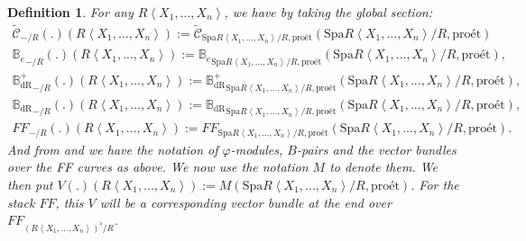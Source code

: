 \documentclass[12pt]{book}
\newtheorem{definition}{Definition}
\begin{document}
\begin{definition}
For any $R\left<X_1,...,X_n\right>$, we have by taking the global section:
\begin{align}
\widetilde{\mathcal{C}}_{-/R}(.)(R\left<X_1,...,X_n\right>):=\widetilde{\mathcal{C}}_{\mathrm{Spa}R\left<X_1,...,X_n\right>/R,\text{pro\'et}}(\mathrm{Spa}R\left<X_1,...,X_n\right>/R,\text{pro\'et})\\
{\mathbb{B}_e}_{-/R}(.)(R\left<X_1,...,X_n\right>):={\mathbb{B}_e}_{\mathrm{Spa}R\left<X_1,...,X_n\right>/R,\text{pro\'et}}(\mathrm{Spa}R\left<X_1,...,X_n\right>/R,\text{pro\'et}),\\
{\mathbb{B}_\mathrm{dR}^+}_{-/R}(.)(R\left<X_1,...,X_n\right>):={\mathbb{B}_\mathrm{dR}^+}_{\mathrm{Spa}R\left<X_1,...,X_n\right>/R,\text{pro\'et}}(\mathrm{Spa}R\left<X_1,...,X_n\right>/R,\text{pro\'et}),\\
{\mathbb{B}_\mathrm{dR}}_{-/R}(.)(R\left<X_1,...,X_n\right>):={\mathbb{B}_\mathrm{dR}}_{\mathrm{Spa}R\left<X_1,...,X_n\right>/R,\text{pro\'et}}(\mathrm{Spa}R\left<X_1,...,X_n\right>/R,\text{pro\'et}),\\
{{FF}}_{-/R}(.)(R\left<X_1,...,X_n\right>):={FF}_{\mathrm{Spa}R\left<X_1,...,X_n\right>/R,\text{pro\'et}}(\mathrm{Spa}R\left<X_1,...,X_n\right>/R,\text{pro\'et}).
\end{align}
And from \cite[Definition 9.3.3, Definition 9.3.5, Definition 9.3.11, Definition 9.3.9]{KL1} and \cite{KL2} we have the notation of $\varphi$-modules, $B$-pairs and the vector bundles over the FF curves as above. We now use the notation $M$ to denote them. We then put $V(.)(R\left<X_1,...,X_n\right>):=M(\mathrm{Spa}R\left<X_1,...,X_n\right>/R,\text{pro\'et})$. For the stack $FF$, this $V$ will be a corresponding vector bundle at the end over $FF_{(R\left<X_1,...,X_n\right>)^\flat/R}$. 	
\end{definition}
  
\end{document}
